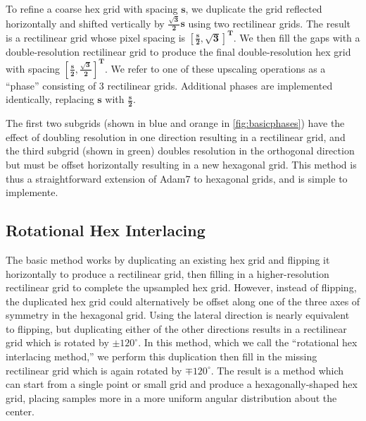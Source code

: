 \documentclass[aip, amsmath, amssymb, nobibnotes, nofootinbib, citeautoscript, reprint, superscriptaddress]{revtex4-1}
\begin{document}
    To refine a coarse hex grid with spacing $\mathbf{s}$, we duplicate the grid reflected horizontally and shifted vertically by $\mathbf{\frac{\sqrt{3}}{2} s}$ using two rectilinear grids.
    The result is a rectilinear grid whose pixel spacing is $\mathbf{\left[\frac{s}{2}, \sqrt{3}\right]^T}$.
    We then fill the gaps with a double-resolution rectilinear grid to produce the final double-resolution hex grid with spacing $\mathbf{\left[\frac{s}{2}, \frac{\sqrt{3}}{2}\right]^T}$.
    We refer to one of these upscaling operations as a ``phase'' consisting of 3 rectilinear grids.
    Additional phases are implemented identically, replacing $\mathbf{s}$ with $\mathbf{\frac{s}{2}}$.



    The first two subgrids (shown in blue and orange in \autoref{fig:basicphases}) have the effect of doubling resolution in one direction
    resulting in a rectilinear grid, and the third subgrid (shown in green) doubles resolution in the orthogonal direction but must be
    offset horizontally resulting in a new hexagonal grid.
    This method is thus a straightforward extension of Adam7 to hexagonal grids, and
    is simple to implemente.


    \subsection{\label{ssec:triple-grid-interlacing}Rotational Hex Interlacing}

    The basic method works by duplicating an existing hex grid and flipping it horizontally to produce a rectilinear grid, then filling in a higher-resolution rectilinear grid to complete the upsampled hex grid.
    However, instead of flipping, the duplicated hex grid could alternatively be offset along one of the three axes of symmetry in the hexagonal grid.
    Using the lateral direction is nearly equivalent to flipping, but duplicating either of the other directions results in a rectilinear grid which is rotated by $\mathrm{\pm 120^{\circ}}$.
    In this method, which we call the ``rotational hex interlacing method,'' we perform this duplication then fill in the missing rectilinear grid which is again rotated by $\mathrm{\mp 120^{\circ}}$.
    The result is a method which can start from a single point or small grid and produce a hexagonally-shaped hex grid, placing samples more in a more uniform angular distribution about the center.
\end{document}
